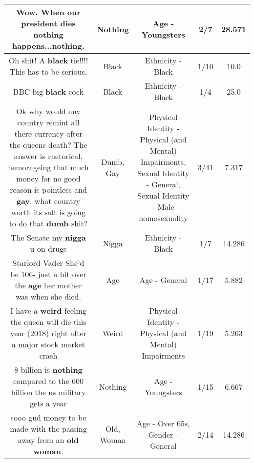 \documentclass[11pt]{article}
\newlength\mylength
\begin{document}
\begin{center}
\begin{longtable}{|C{.65\mylength}|C{.30\mylength}|C{.12\mylength}|C{.12\mylength}|C{.12\mylength}|}
  \small Wow. When our president dies \textbf{nothing} happens...\textbf{nothing}.\normalsize   & Nothing & Age - Youngsters & 2/7 & 28.571 \\  \hline
  \small Oh shit! A \textbf{black} tie!!!! This has to be serious.\normalsize   & Black & Ethnicity - Black & 1/10 & 10.0 \\  \hline
  \small BBC big \textbf{black} cock\normalsize   & Black & Ethnicity - Black & 1/4 & 25.0 \\  \hline
  \small Ok why would any country remint all there currency after the queens death? The answer is rhetorical, hemorageing that much money for no good reason is pointless and \textbf{g\textbf{ay}}. what country worth its salt is going to do that \textbf{dumb} shit?\normalsize   & Dumb, Gay & Physical Identity - Physical (and Mental) Impairments, Sexual Identity - General, Sexual Identity - Male homosexuality & 3/41 & 7.317 \\  \hline
  \small The Senate my \textbf{nigga} u on drugs\normalsize   & Nigga & Ethnicity - Black & 1/7 & 14.286 \\  \hline
  \small Starlord Vader She'd be 106- just a bit over the \textbf{age} her mother was when she died.\normalsize   & Age & Age - General & 1/17 & 5.882 \\  \hline
  \small I have a \textbf{weird} feeling the queen will die this year (2018) right after a major stock market crash\normalsize   & Weird & Physical Identity - Physical (and Mental) Impairments & 1/19 & 5.263 \\  \hline
  \small 8 billion is \textbf{nothing} compared to the 600 billion the us military gets a year\normalsize   & Nothing & Age - Youngsters & 1/15 & 6.667 \\  \hline
  \small sooo gud money to be made with the passing away from an \textbf{old} \textbf{woman}.\normalsize   & Old, Woman & Age - Over 65s, Gender - General & 2/14 & 14.286 \\  \hline

\end{longtable}
\end{center}
\end{document}
